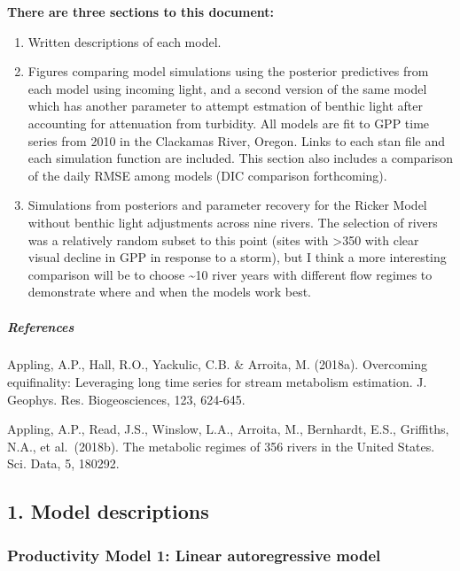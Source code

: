 \documentclass[
]{article}
\begin{document}
\textbf{There are three sections to this document:}

\begin{enumerate}
\def\labelenumi{\arabic{enumi}.}
\item
  Written descriptions of each model.
\item
  Figures comparing model simulations using the posterior predictives
  from each model using incoming light, and a second version of the same
  model which has another parameter to attempt estmation of benthic
  light after accounting for attenuation from turbidity. All models are
  fit to GPP time series from 2010 in the Clackamas River, Oregon. Links
  to each stan file and each simulation function are included. This
  section also includes a comparison of the daily RMSE among models (DIC
  comparison forthcoming).
\item
  Simulations from posteriors and parameter recovery for the Ricker
  Model without benthic light adjustments across nine rivers. The
  selection of rivers was a relatively random subset to this point
  (sites with \textgreater350 with clear visual decline in GPP in
  response to a storm), but I think a more interesting comparison will
  be to choose \textasciitilde10 river years with different flow regimes
  to demonstrate where and when the models work best.
\end{enumerate}

\hypertarget{references}{%
\subparagraph{References}\label{references}}

Appling, A.P., Hall, R.O., Yackulic, C.B. \& Arroita, M. (2018a).
Overcoming equifinality: Leveraging long time series for stream
metabolism estimation. J. Geophys. Res. Biogeosciences, 123, 624-645.

Appling, A.P., Read, J.S., Winslow, L.A., Arroita, M., Bernhardt, E.S.,
Griffiths, N.A., et al.~(2018b). The metabolic regimes of 356 rivers in
the United States. Sci. Data, 5, 180292.

\hypertarget{model-descriptions}{%
\subsection{1. Model descriptions}\label{model-descriptions}}

\hypertarget{productivity-model-1-linear-autoregressive-model}{%
\subsubsection{Productivity Model 1: Linear autoregressive
model}\label{productivity-model-1-linear-autoregressive-model}}
\end{document}
